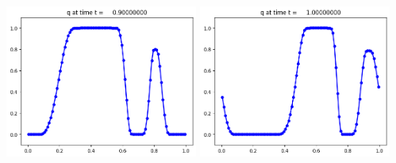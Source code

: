 \documentclass[11pt]{article}
\begin{document}
\includegraphics[width=0.475\textwidth]{frame0009fig1.png}
\vskip 10pt 
\includegraphics[width=0.475\textwidth]{frame0010fig1.png}
\end{document}
